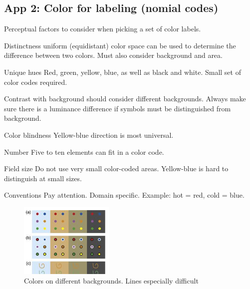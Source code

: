 \begin{mdframed}\begin{multicols}{2}
    \subsection{App 2: Color for labeling (nomial codes)}
    Perceptual factors to consider when picking a set of color labels.
\begin{compactdesc}
\item[Distinctness] uniform (equidistant) color space can be used to determine
    the difference between two colors. Must also consider background and area.
    \item[Unique hues] Red, green, yellow, blue, as well as black and white.
        Small set of color codes required.
    \item[Contrast with background] should consider different backgrounds.
        Always make sure there is a luminance difference if symbols must be
        distinguished from background.
    \item[Color blindness] Yellow-blue direction is most universal.
    \item[Number] Five to ten elements can fit in a color code.
    \item[Field size] Do not use very small color-coded areas. Yellow-blue is
        hard to distinguish at small sizes.
    \item[Conventions] Pay attention. Domain specific. Example: hot = red,
        cold = blue.
\end{compactdesc}
\begin{figure}[H]
\centering
\includegraphics[width=0.4\textwidth]{colors_on_backgrounds.png}
\caption{Colors on different backgrounds. Lines especially difficult}
\end{figure}



\end{multicols}\end{mdframed}


